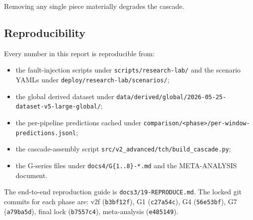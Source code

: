 Removing any single piece materially degrades the cascade.

\subsection{Reproducibility}

Every number in this report is reproducible from:

\begin{itemize}
\item the fault-injection scripts under \texttt{scripts/research-lab/} and the scenario YAMLs under \texttt{deploy/research-lab/scenarios/};
\item the global derived dataset under \texttt{data/derived/global/2026-05-25-dataset-v5-large-global/};
\item the per-pipeline predictions cached under \texttt{comparison/<phase>/per-window-predictions.jsonl};
\item the cascade-assembly script \texttt{src/v2\_advanced/tch/build\_cascade.py};
\item the G-series files under \texttt{docs4/G\{1..8\}-*.md} and the META-ANALYSIS document.
\end{itemize}

The end-to-end reproduction guide is \texttt{docs3/19-REPRODUCE.md}. The locked git commits for each phase are: v2f (\texttt{b3bf12f}), G1 (\texttt{c27a54c}), G4 (\texttt{56e53bf}), G7 (\texttt{a79ba5d}), final lock (\texttt{b7557c4}), meta-analysis (\texttt{e485149}).
